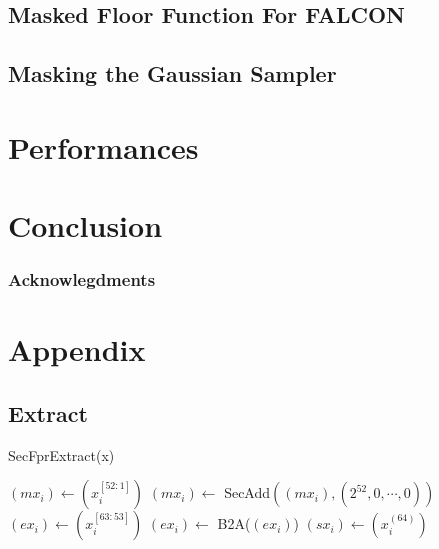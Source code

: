 \documentclass[runningheads]{llncs}
\begin{document}
\subsection{Masked Floor Function For FALCON}
\subsection{Masking the Gaussian Sampler}
\section{Performances}\label{sec:perf}



\section{Conclusion}\label{sec:conclusion}
\subsubsection{Acknowlegdments}

%
%
%

\newpage


 
 

\newpage

\section*{Appendix}


\subsection*{Extract}

\begin{algorithm}[H]
  \caption{SecFprExtract(x)}
  \label{algo:SecFprExtract }
  $(mx_i) \leftarrow (x_i^{[52:1]})$\;
  $(mx_i) \leftarrow$ SecAdd$((mx_i), (2^{52}, 0, \cdots, 0))$ 
  $(ex_i) \leftarrow (x_i^{[63:53]})$\;
  $(ex_i) \leftarrow$ B2A($(ex_i)$)\;
  $(sx_i) \leftarrow (x_i^{(64)})$\;
\;
\end{algorithm}
\end{document}
